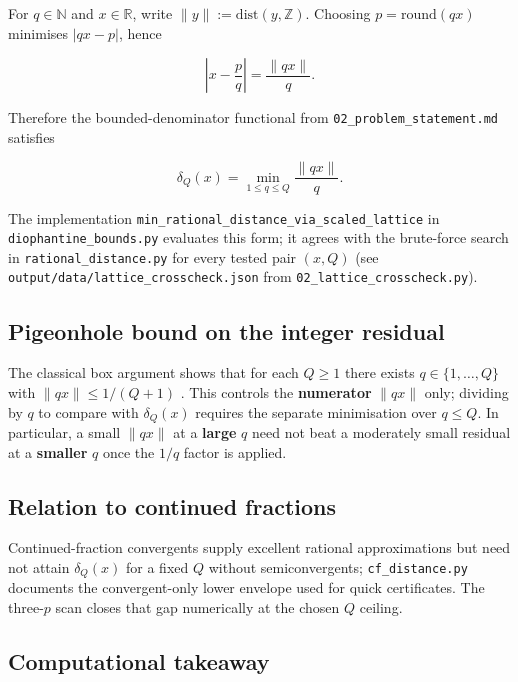 \documentclass[
]{article}
\begin{document}
For \(q \in \mathbb{N}\) and \(x \in \mathbb{R}\), write
\(\|y\| := \mathrm{dist}(y,\mathbb{Z})\). Choosing
\(p = \mathrm{round}(qx)\) minimises \(|qx - p|\), hence

\[
\left|x - \frac{p}{q}\right| = \frac{\|qx\|}{q}.
\]

Therefore the bounded-denominator functional from
\texttt{02\_problem\_statement.md} satisfies

\[
\delta_Q(x) = \min_{1 \leq q \leq Q} \frac{\|qx\|}{q}.
\]

The implementation
\texttt{min\_rational\_distance\_via\_scaled\_lattice} in
\texttt{diophantine\_bounds.py} evaluates this form; it agrees with the
brute-force search in \texttt{rational\_distance.py} for every tested
pair \((x,Q)\) (see \texttt{output/data/lattice\_crosscheck.json} from
\texttt{02\_lattice\_crosscheck.py}).

\subsection{Pigeonhole bound on the integer
residual}\label{pigeonhole-bound-on-the-integer-residual}

The classical box argument shows that for each \(Q \geq 1\) there exists
\(q \in \{1,\ldots,Q\}\) with \(\|qx\| \leq 1/(Q+1)\)
\citep{cassels1957}. This controls the \textbf{numerator} \(\|qx\|\)
only; dividing by \(q\) to compare with \(\delta_Q(x)\) requires the
separate minimisation over \(q \leq Q\). In particular, a small
\(\|qx\|\) at a \textbf{large} \(q\) need not beat a moderately small
residual at a \textbf{smaller} \(q\) once the \(1/q\) factor is applied.

\subsection{Relation to continued
fractions}\label{relation-to-continued-fractions}

Continued-fraction convergents supply excellent rational approximations
but need not attain \(\delta_Q(x)\) for a fixed \(Q\) without
semiconvergents; \texttt{cf\_distance.py} documents the convergent-only
lower envelope used for quick certificates. The three-\(p\) scan closes
that gap numerically at the chosen \(Q\) ceiling.

\subsection{Computational takeaway}\label{computational-takeaway}
\end{document}
